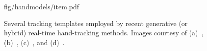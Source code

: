 \providecommand{\yoff}{0}
\begin{figure}[t!]
\centering
\begin{overpic} 
[width=\linewidth]
{fig/handmodels/item.pdf}
\end{overpic}
\caption{
% 
%
Several tracking templates employed by recent generative (or hybrid) real-time hand-tracking methods.
% 
Images courtesy of
(a)~\protect\cite{oiko2011hand},
(b)~\protect\cite{sridhar2013multicam}, 
(c)~\protect\cite{taylor2016concerto}, and
(d)~\protect\cite{melax2013dynamics}.
% 
% 
}
\label{fig:handmodels}
\end{figure}

